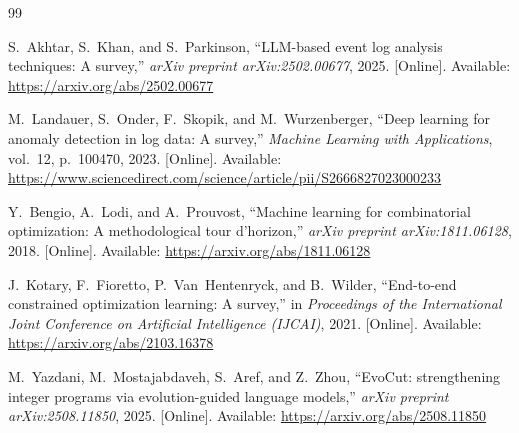 \documentclass[11pt]{article}
\begin{document}




\begin{thebibliography}{99}

    S.~Akhtar, S.~Khan, and S.~Parkinson, ``LLM-based event log analysis techniques: A survey,'' 
    \emph{arXiv preprint arXiv:2502.00677}, 2025. 
    [Online]. Available: \url{https://arxiv.org/abs/2502.00677}
    
    M.~Landauer, S.~Onder, F.~Skopik, and M.~Wurzenberger, ``Deep learning for anomaly detection in log data: A survey,'' 
    \emph{Machine Learning with Applications}, vol.~12, p.~100470, 2023. 
    [Online]. Available: \url{https://www.sciencedirect.com/science/article/pii/S2666827023000233}
    
    Y.~Bengio, A.~Lodi, and A.~Prouvost, ``Machine learning for combinatorial optimization: A methodological tour d'horizon,'' 
    \emph{arXiv preprint arXiv:1811.06128}, 2018. 
    [Online]. Available: \url{https://arxiv.org/abs/1811.06128}
    
    J.~Kotary, F.~Fioretto, P.~Van~Hentenryck, and B.~Wilder, ``End-to-end constrained optimization learning: A survey,'' 
    in \emph{Proceedings of the International Joint Conference on Artificial Intelligence (IJCAI)}, 2021. 
    [Online]. Available: \url{https://arxiv.org/abs/2103.16378}
    
    M.~Yazdani, M.~Mostajabdaveh, S.~Aref, and Z.~Zhou, ``EvoCut: strengthening integer programs via evolution-guided language models,'' 
    \emph{arXiv preprint arXiv:2508.11850}, 2025. 
    [Online]. Available: \url{https://arxiv.org/abs/2508.11850}
    
\end{thebibliography}
\end{document}
